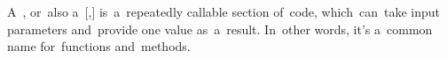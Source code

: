 \label{subroutine}
A~, or~also a~[,] is~a~repeatedly callable section of~code, which~can~take input parameters and~provide one value as~a~result.
In~other words, it's a~common name for~functions and~methods.
\newpage
